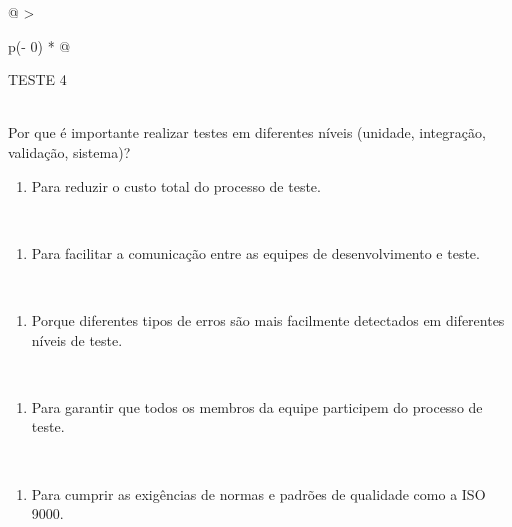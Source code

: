 \documentclass[
]{book}
\providecommand{\tightlist}{%
  \setlength{\itemsep}{0pt}\setlength{\parskip}{0pt}}
\begin{document}
\begin{longtable}[]{@{}
  >{\raggedright\arraybackslash}p{(\columnwidth - 0\tabcolsep) * }@{}}
\toprule\noalign{}
\begin{minipage}[b]{\linewidth}\raggedright
TESTE 4
\end{minipage} \\
\midrule\noalign{}
\endhead
\bottomrule\noalign{}
\endlastfoot
Por que é importante realizar testes em diferentes níveis (unidade, integração, validação, sistema)? \\
\begin{minipage}[t]{\linewidth}\raggedright
\begin{enumerate}
\def\labelenumi{\Alph{enumi})}
\tightlist
\item
  Para reduzir o custo total do processo de teste.
\end{enumerate}
\end{minipage} \\
\begin{minipage}[t]{\linewidth}\raggedright
\begin{enumerate}
\def\labelenumi{\Alph{enumi})}
\setcounter{enumi}{1}
\tightlist
\item
  Para facilitar a comunicação entre as equipes de desenvolvimento e teste.
\end{enumerate}
\end{minipage} \\
\begin{minipage}[t]{\linewidth}\raggedright
\begin{enumerate}
\def\labelenumi{\Alph{enumi})}
\setcounter{enumi}{2}
\tightlist
\item
  Porque diferentes tipos de erros são mais facilmente detectados em diferentes níveis de teste.
\end{enumerate}
\end{minipage} \\
\begin{minipage}[t]{\linewidth}\raggedright
\begin{enumerate}
\def\labelenumi{\Alph{enumi})}
\setcounter{enumi}{3}
\tightlist
\item
  Para garantir que todos os membros da equipe participem do processo de teste.
\end{enumerate}
\end{minipage} \\
\begin{minipage}[t]{\linewidth}\raggedright
\begin{enumerate}
\def\labelenumi{\Alph{enumi})}
\setcounter{enumi}{4}
\tightlist
\item
  Para cumprir as exigências de normas e padrões de qualidade como a ISO 9000.
\end{enumerate}
\end{minipage} \\
\end{longtable}
\end{document}
